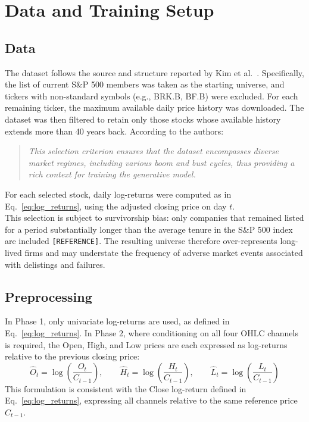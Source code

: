 \chapter{Data and Training Setup}
\label{ch:data_setup}

\section{Data}

The dataset follows the source and structure reported by Kim et al.\ \cite{kim2025diffusion}.
Specifically, the list of current S\&P 500 members was taken as the starting universe, and
tickers with non-standard symbols (e.g., BRK.B, BF.B) were excluded. For each remaining
ticker, the maximum available daily price history was downloaded. The dataset was then
filtered to retain only those stocks whose available history extends more than 40 years back.
According to the authors:
\begin{quote}
    \emph{This selection criterion ensures that the dataset encompasses diverse market
    regimes, including various boom and bust cycles, thus providing a rich context for
    training the generative model.}
\end{quote}
For each selected stock, daily log-returns were computed as in Eq.~\ref{eq:log_returns},
using the adjusted closing price on day \(t\).\\

This selection is subject to survivorship bias: only companies that remained listed for a
period substantially longer than the average tenure in the S\&P 500 index are included
\texttt{[REFERENCE]}. The resulting universe therefore over-represents long-lived firms
and may understate the frequency of adverse market events associated with delistings
and failures.

\section{Preprocessing}

In Phase 1, only univariate log-returns are used, as defined in Eq.~\ref{eq:log_returns}.
In Phase 2, where conditioning on all four OHLC channels is required, the Open, High,
and Low prices are each expressed as log-returns relative to the previous closing price:
\[
    \hat{O}_t = \log\!\left(\frac{O_t}{C_{t-1}}\right), \qquad
    \hat{H}_t = \log\!\left(\frac{H_t}{C_{t-1}}\right), \qquad
    \hat{L}_t = \log\!\left(\frac{L_t}{C_{t-1}}\right)
\]
This formulation is consistent with the Close log-return defined in Eq.~\ref{eq:log_returns},
expressing all channels relative to the same reference price \(C_{t-1}\).\\

